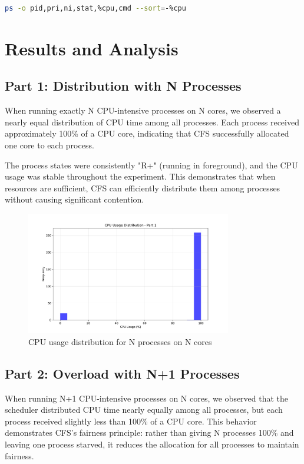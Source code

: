 \documentclass[12pt,a4paper]{article}
\begin{document}
\begin{lstlisting}[language=bash]
ps -o pid,pri,ni,stat,%cpu,cmd --sort=-%cpu
\end{lstlisting}

\section{Results and Analysis}

\subsection{Part 1: Distribution with N Processes}

When running exactly N CPU-intensive processes on N cores, we observed a nearly equal distribution of CPU time among all processes. Each process received approximately 100\% of a CPU core, indicating that CFS successfully allocated one core to each process.

The process states were consistently "R+" (running in foreground), and the CPU usage was stable throughout the experiment. This demonstrates that when resources are sufficient, CFS can efficiently distribute them among processes without causing significant contention.

\begin{figure}[H]
    \centering
    \includegraphics[width=0.8\textwidth]{figures/cpu_dist_part1.pdf}
    \caption{CPU usage distribution for N processes on N cores}
    \label{fig:part1_cpu}
\end{figure}

\subsection{Part 2: Overload with N+1 Processes}

When running N+1 CPU-intensive processes on N cores, we observed that the scheduler distributed CPU time nearly equally among all processes, but each process received slightly less than 100\% of a CPU core. This behavior demonstrates CFS's fairness principle: rather than giving N processes 100\% and leaving one process starved, it reduces the allocation for all processes to maintain fairness.
\end{document}
